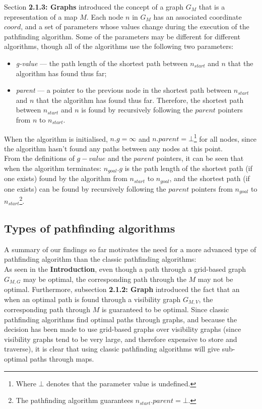 \documentclass[12pt,notitlepage]{report}
\begin{document}
\noindent
Section {\bfseries 2.1.3: Graphs} introduced the concept of a graph $G_{M}$ that is a representation of a map $M$. Each node $n$ in $G_{M}$ has an associated coordinate $coord$, and a set of parameters whose values change during the execution of the pathfinding algorithm. Some of the parameters may be different for different algorithms, though all of the algorithms use the following two parameters:
\begin{itemize}
\item {\em g-value} --- the path length of the shortest path between $n_{start}$ and $n$ that the algorithm has found thus far;
\item {\em parent} --- a pointer to the previous node in the shortest path between $n_{start}$ and $n$ that the algorithm has found thus far. Therefore, the shortest path between $n_{start}$ and $n$ is found by recursively following the $parent$ pointers from $n$ to $n_{start}$.
\end{itemize}

\noindent
When the algorithm is initialised, $n.g = \infty$ and $n.parent = \bot$\footnote{Where $\bot$ denotes that the parameter value is undefined.} for all nodes, since the algorithm hasn't found any paths between any nodes at this point.\\

\noindent
From the definitions of $g-value$ and the $parent$ pointers, it can be seen that when the algorithm terminates: $n_{goal}.g$ is the path length of the shortest path (if one exists) found by the algorithm from $n_{start}$ to $n_{goal}$, and the shortest path (if one exists) can be found by recursively following the $parent$ pointers from $n_{goal}$ to $n_{start}$\footnote{The pathfinding algorithm guarantees $n_{start}.parent = \bot$.}.

\subsection {Types of pathfinding algorithms}

A summary of our findings so far motivates the need for a more advanced type of pathfinding algorithm than the classic pathfinding algorithms:\\

\noindent
As seen in the {\bfseries Introduction}, even though a path through a grid-based graph $G_{M,G}$ may be optimal, the corresponding path through the $M$ may not be optimal. Furthermore, subsection {\bfseries 2.1.2: Graph} introduced the fact that an when an optimal path is found through a visibility graph $G_{M,V}$, the corresponding path through $M$ is guaranteed to be optimal. Since classic pathfinding algorithms find optimal paths through graphs, and because the decision has been made to use grid-based graphs over visibility graphs (since visibility graphs tend to be very large, and therefore expensive to store and traverse), it is clear that using classic pathfinding algorithms will give sub-optimal paths through maps.\\
\end{document}
